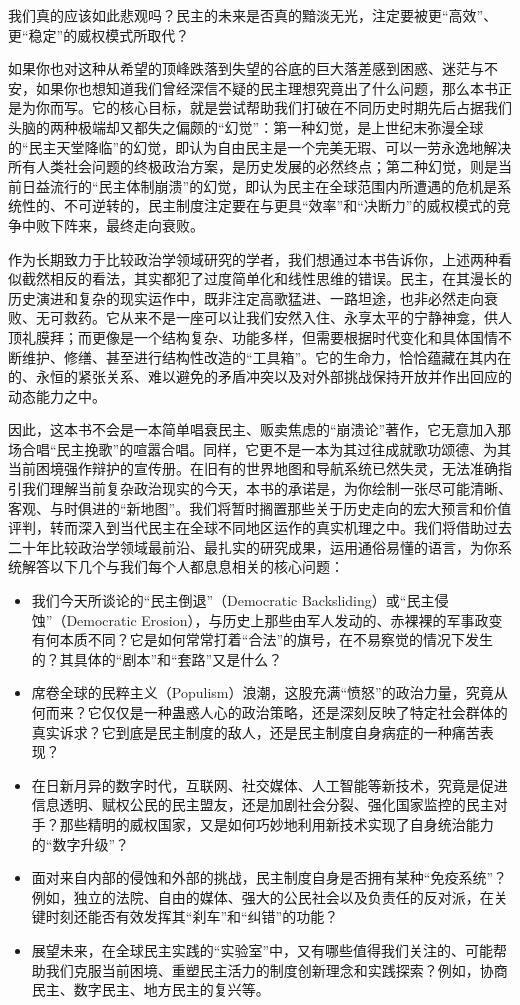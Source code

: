 \documentclass[UTF8, 10pt]{ctexbook}
\begin{document}
我们真的应该如此悲观吗？民主的未来是否真的黯淡无光，注定要被更“高效”、更“稳定”的威权模式所取代？

如果你也对这种从希望的顶峰跌落到失望的谷底的巨大落差感到困惑、迷茫与不安，如果你也想知道我们曾经深信不疑的民主理想究竟出了什么问题，那么本书正是为你而写。它的核心目标，就是尝试帮助我们打破在不同历史时期先后占据我们头脑的两种极端却又都失之偏颇的“幻觉”：第一种幻觉，是上世纪末弥漫全球的“民主天堂降临”的幻觉，即认为自由民主是一个完美无瑕、可以一劳永逸地解决所有人类社会问题的终极政治方案，是历史发展的必然终点；第二种幻觉，则是当前日益流行的“民主体制崩溃”的幻觉，即认为民主在全球范围内所遭遇的危机是系统性的、不可逆转的，民主制度注定要在与更具“效率”和“决断力”的威权模式的竞争中败下阵来，最终走向衰败。

作为长期致力于比较政治学领域研究的学者，我们想通过本书告诉你，上述两种看似截然相反的看法，其实都犯了过度简单化和线性思维的错误。民主，在其漫长的历史演进和复杂的现实运作中，既非注定高歌猛进、一路坦途，也非必然走向衰败、无可救药。它从来不是一座可以让我们安然入住、永享太平的宁静神龛，供人顶礼膜拜；而更像是一个结构复杂、功能多样，但需要根据时代变化和具体国情不断维护、修缮、甚至进行结构性改造的“工具箱”。它的生命力，恰恰蕴藏在其内在的、永恒的紧张关系、难以避免的矛盾冲突以及对外部挑战保持开放并作出回应的动态能力之中。

因此，这本书不会是一本简单唱衰民主、贩卖焦虑的“崩溃论”著作，它无意加入那场合唱“民主挽歌”的喧嚣合唱。同样，它更不是一本为其过往成就歌功颂德、为其当前困境强作辩护的宣传册。在旧有的世界地图和导航系统已然失灵，无法准确指引我们理解当前复杂政治现实的今天，本书的承诺是，为你绘制一张尽可能清晰、客观、与时俱进的“新地图”。我们将暂时搁置那些关于历史走向的宏大预言和价值评判，转而深入到当代民主在全球不同地区运作的真实机理之中。我们将借助过去二十年比较政治学领域最前沿、最扎实的研究成果，运用通俗易懂的语言，为你系统解答以下几个与我们每个人都息息相关的核心问题：
\begin{itemize}
    \item 我们今天所谈论的“民主倒退”（Democratic Backsliding）或“民主侵蚀”（Democratic Erosion），与历史上那些由军人发动的、赤裸裸的军事政变有何本质不同？它是如何常常打着“合法”的旗号，在不易察觉的情况下发生的？其具体的“剧本”和“套路”又是什么？
    \item 席卷全球的民粹主义（Populism）浪潮，这股充满“愤怒”的政治力量，究竟从何而来？它仅仅是一种蛊惑人心的政治策略，还是深刻反映了特定社会群体的真实诉求？它到底是民主制度的敌人，还是民主制度自身病症的一种痛苦表现？
    \item 在日新月异的数字时代，互联网、社交媒体、人工智能等新技术，究竟是促进信息透明、赋权公民的民主盟友，还是加剧社会分裂、强化国家监控的民主对手？那些精明的威权国家，又是如何巧妙地利用新技术实现了自身统治能力的“数字升级”？
    \item 面对来自内部的侵蚀和外部的挑战，民主制度自身是否拥有某种“免疫系统”？例如，独立的法院、自由的媒体、强大的公民社会以及负责任的反对派，在关键时刻还能否有效发挥其“刹车”和“纠错”的功能？
    \item 展望未来，在全球民主实践的“实验室”中，又有哪些值得我们关注的、可能帮助我们克服当前困境、重塑民主活力的制度创新理念和实践探索？例如，协商民主、数字民主、地方民主的复兴等。
\end{itemize}
\end{document}
